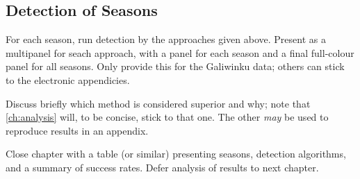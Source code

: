 \subsection{Detection of Seasons}
For each season, run detection by the approaches given above.
Present as a multipanel for seach approach, with a panel for each season
and a final full-colour panel for all seasons.  Only provide this for the
Galiwinku data; others can stick to the electronic appendicies.

Discuss briefly which method is considered superior and why; note
that \autoref{ch:analysis} will, to be concise, stick to that one.
The other \emph{may} be used to reproduce results in an appendix.

Close chapter with a table (or similar) presenting seasons, detection
algorithms, and a summary of success rates.  Defer analysis of results
to next chapter.


